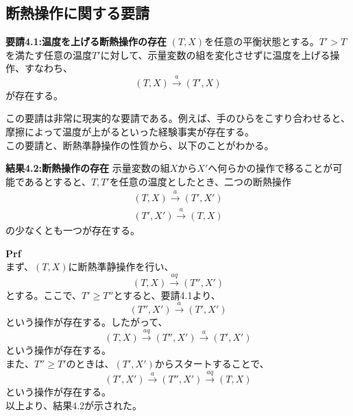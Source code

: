 \documentclass[a4paper,11pt]{jsarticle}
\begin{document}
\subsection{断熱操作に関する要請}
\begin{itembox}[l]{\textbf{要請4.1:温度を上げる断熱操作の存在}}
    $(T,X)$を任意の平衡状態とする。$T'>T$を満たす任意の温度$T'$に対して、示量変数の組を変化させずに温度を上げる操作、すなわち、
    \begin{equation}
        (T,X) \xrightarrow{a} (T',X)
    \end{equation}
    が存在する。
\end{itembox}
この要請は非常に現実的な要請である。例えば、手のひらをこすり合わせると、摩擦によって温度が上がるといった経験事実が存在する。\\
この要請と、断熱準静操作の性質から、以下のことがわかる。\\
\begin{itembox}[l]{\textbf{結果4.2:断熱操作の存在}}
    示量変数の組$X$から$X'$へ何らかの操作で移ることが可能であるとすると、$T,T'$を任意の温度としたとき、二つの断熱操作
    \begin{align}
        (T,X) \xrightarrow{a} (T',X')\\
        (T',X') \xrightarrow{a} (T,X)
    \end{align}
    の少なくとも一つが存在する。
\end{itembox}
\textbf{Prf}\\
まず、$(T,X)$に断熱準静操作を行い、
\begin{equation}
    (T,X) \xrightarrow{aq} (T'',X')
\end{equation}
とする。ここで、$T'\geq T''$とすると、要請4.1より、
\begin{equation}
    (T'',X') \xrightarrow{a} (T',X')
\end{equation}
という操作が存在する。したがって、
\begin{equation}
    (T,X) \xrightarrow{aq} (T'',X') \xrightarrow{a} (T',X')
\end{equation}
という操作が存在する。\\
また、$T''\geq T'$のときは、$(T',X') $からスタートすることで、
\begin{equation}
    (T',X') \xrightarrow{a} (T'',X') \xrightarrow{aq} (T,X)
\end{equation}
という操作が存在する。\\
以上より、結果4.2が示された。\\
\end{document}
